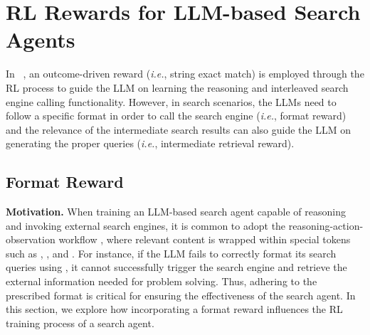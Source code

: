 \section{RL Rewards for LLM-based Search Agents}\label{sec:reward-study}

In ~\citep{jin2025search,zheng2025deepresearcher}, an outcome-driven reward (\textit{i.e.}, string exact match) is employed through the RL process to guide the LLM on learning the reasoning and interleaved search engine calling functionality.
However, in search scenarios, the LLMs need to follow a specific format in order to call the search engine (\textit{i.e.}, format reward) and the relevance of the intermediate search results can also guide the LLM on generating the proper queries (\textit{i.e.}, intermediate retrieval reward). 

\subsection{Format Reward}\label{sec:format-reward}

\textbf{Motivation.} 
When training an LLM-based search agent capable of reasoning and invoking external search engines, it is common to adopt the reasoning-action-observation workflow \cite{yao2023react}, where relevant content is wrapped within special tokens such as \think{}, \search{}, and \info{}.
For instance, if the LLM fails to correctly format its search queries using \search{}, it cannot successfully trigger the search engine and retrieve the external information needed for problem solving.
Thus, adhering to the prescribed format is critical for ensuring the effectiveness of the search agent.
In this section, we explore how incorporating a format reward influences the RL training process of a search agent.

